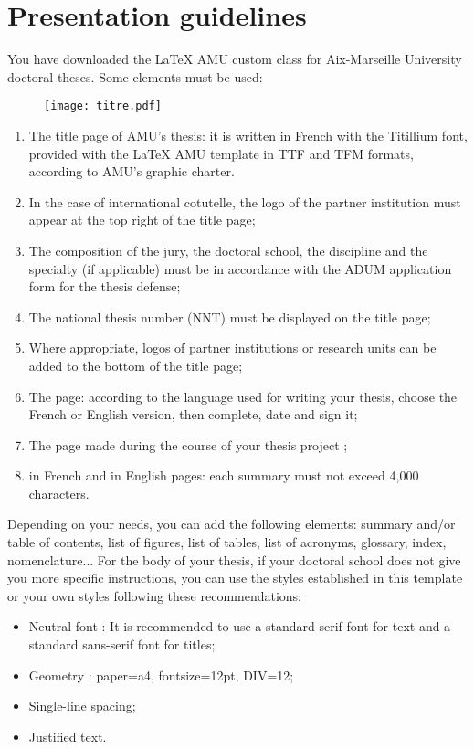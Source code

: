 \chapter{Presentation guidelines}
\label{chap:guidelines}
You have downloaded the LaTeX AMU custom class for Aix-Marseille University doctoral theses. Some elements must be used:
\\


\begin{figure}[h!tbp]
	\centering
	\texttt{[image: titre.pdf]}
\end{figure}

\begin{enumerate}
    \item The title page of AMU’s thesis: it is written in French with the Titillium font, provided with the LaTeX AMU template in TTF and TFM formats, according to AMU’s graphic charter.
    \item In the case of international cotutelle, the logo of the partner institution must appear at the top right of the title page;
	\item The composition of the jury, the doctoral school, the discipline and the specialty (if applicable) must be in accordance with the ADUM application form for the thesis defense;
	\item The national thesis number (NNT) must be displayed on the title page;
	\item Where appropriate, logos of partner institutions or research units can be added to the bottom of the title page;
	\item The  page: according to the language used for writing your thesis, choose the French or English version, then complete, date and sign it;
	\item The  page made during the course of your thesis project ;
	\item {} in French and  in English pages: each summary must not exceed 4,000 characters.\\
\end{enumerate}

Depending on your needs, you can add the following elements: summary and/or table of contents, list of figures, list of tables, list of acronyms, glossary, index, nomenclature...
For the body of your thesis, if your doctoral school does not give you more specific instructions, you can use the styles established in this template or your own styles following these recommendations:
\begin{itemize}
	\item Neutral font : It is recommended to use a standard serif font for text and a standard sans-serif font for titles;
	\item Geometry : paper=a4, fontsize=12pt, DIV=12;
	\item Single-line spacing;
	\item Justified text.\\
\end{itemize}

